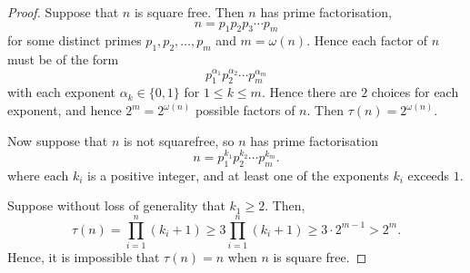 \documentclass{unswmaths}
\begin{document}
\begin{proof}
    Suppose that $n$ is square free. Then $n$ has prime factorisation,
    \begin{equation*}
        n = p_1p_2p_3\cdots p_m
    \end{equation*}
    for some distinct primes $p_1,p_2,\ldots,p_m$ and $m = \omega(n)$. Hence each factor of $n$ must be of
    the form
    \begin{equation*}
        p_1^{\alpha_1}p_2^{\alpha_2}\cdots p_m^{\alpha_m}
    \end{equation*}
    with each exponent $\alpha_k \in \{0,1\}$ for $1\leq k \leq m$. Hence there
    are $2$ choices for each exponent, and hence $2^m = 2^{\omega(n)}$ possible
    factors of $n$. Then $\tau(n) = 2^{\omega(n)}$.
    
    Now suppose that $n$ is not squarefree, so $n$ has prime factorisation
    \begin{equation*}
        n = p_1^{k_1}p_2^{k_2}\cdots p_m^{k_m}.
    \end{equation*}
    where each $k_i$ is a positive integer, and at least one of the exponents $k_i$ exceeds $1$. 
    
    Suppose without loss of generality that $k_1 \geq 2$. Then,
    \begin{equation*}
        \tau(n) = \prod_{i=1}^n (k_i+1) \geq 3\prod_{i=1}^n (k_i+1) \geq 3\cdot 2^{m-1} > 2^m.
    \end{equation*}
    Hence, it is impossible that $\tau(n) = n$ when $n$ is square free.
\end{proof} 
\end{document}
